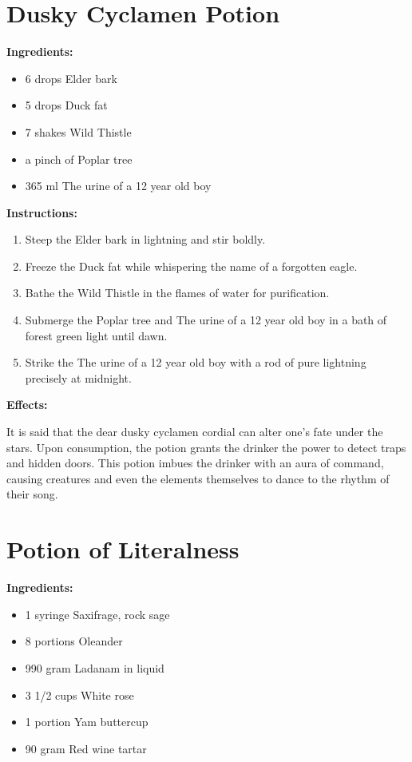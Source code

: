 \documentclass{article}
\begin{document}
\newpage
\section*{Dusky Cyclamen Potion}

\textbf{Ingredients:}

\begin{itemize}
  \item 6 drops Elder bark
  \item 5 drops Duck fat
  \item 7 shakes Wild Thistle
  \item a pinch of Poplar tree
  \item 365 ml The urine of a 12 year old boy
\end{itemize}

\textbf{Instructions:}

\begin{enumerate}
  \item Steep the Elder bark in lightning and stir boldly.
  \item Freeze the Duck fat while whispering the name of a forgotten eagle.
  \item Bathe the Wild Thistle in the flames of water for purification.
  \item Submerge the Poplar tree and The urine of a 12 year old boy in a bath of forest green light until dawn.
  \item Strike the The urine of a 12 year old boy with a rod of pure lightning precisely at midnight.
\end{enumerate}

\textbf{Effects:}

It is said that the dear dusky cyclamen cordial can alter one's fate under the stars. Upon consumption, the potion grants the drinker the power to detect traps and hidden doors. This potion imbues the drinker with an aura of command, causing creatures and even the elements themselves to dance to the rhythm of their song.

\newpage
\section*{Potion of Literalness}

\textbf{Ingredients:}

\begin{itemize}
  \item 1 syringe Saxifrage, rock sage
  \item 8 portions Oleander
  \item 990 gram Ladanam in liquid
  \item 3 1/2 cups White rose
  \item 1 portion Yam buttercup
  \item 90 gram Red wine tartar
\end{itemize}
\end{document}

